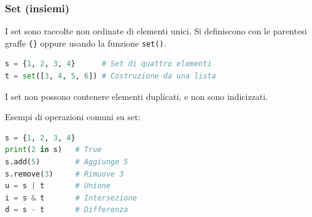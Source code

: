 \subsubsection{Set (insiemi)}
I set sono raccolte non ordinate di elementi unici. Si definiscono con le parentesi graffe \texttt{\{\}} oppure usando la funzione \texttt{set()}.

\begin{lstlisting}[language = python, frame = none]
s = {1, 2, 3, 4}      # Set di quattro elementi
t = set([3, 4, 5, 6]) # Costruzione da una lista
\end{lstlisting}

I set non possono contenere elementi duplicati, e non sono indicizzati.

Esempi di operazioni comuni su set:
\begin{lstlisting}[language = python, frame = none]
s = {1, 2, 3, 4}
print(2 in s)   # True
s.add(5)        # Aggiunge 5
s.remove(3)     # Rimuove 3
u = s | t       # Unione
i = s & t       # Intersezione
d = s - t       # Differenza
\end{lstlisting}

